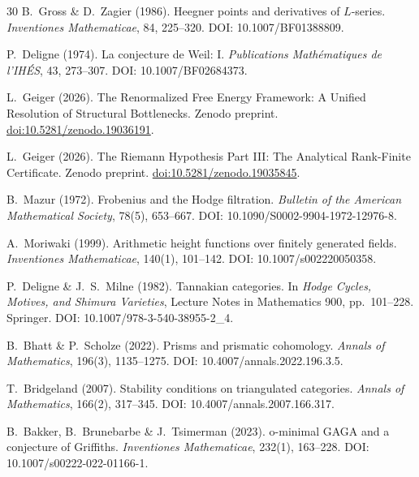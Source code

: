 \documentclass[aps,prd,twocolumn,superscriptaddress,nofootinbib]{revtex4-2}
\theoremstyle{definition}
\theoremstyle{remark}
\begin{document}
\begin{thebibliography}{30}
B.~Gross \& D.~Zagier (1986).
Heegner points and derivatives of $L$-series.
\textit{Inventiones Mathematicae}, 84, 225--320.
DOI: 10.1007/BF01388809.

P.~Deligne (1974).
La conjecture de Weil: I.
\textit{Publications Math\'ematiques de l'IH\'ES}, 43, 273--307.
DOI: 10.1007/BF02684373.

L.~Geiger (2026).
The Renormalized Free Energy Framework: A Unified Resolution of Structural Bottlenecks.
Zenodo preprint.
\href{https://doi.org/10.5281/zenodo.19036191}{doi:10.5281/zenodo.19036191}.

L.~Geiger (2026).
The Riemann Hypothesis Part III: The Analytical Rank-Finite Certificate.
Zenodo preprint.
\href{https://doi.org/10.5281/zenodo.19035845}{doi:10.5281/zenodo.19035845}.

B.~Mazur (1972).
Frobenius and the Hodge filtration.
\textit{Bulletin of the American Mathematical Society}, 78(5), 653--667.
DOI: 10.1090/S0002-9904-1972-12976-8.

A.~Moriwaki (1999).
Arithmetic height functions over finitely generated fields.
\textit{Inventiones Mathematicae}, 140(1), 101--142.
DOI: 10.1007/s002220050358.

P.~Deligne \& J.~S.~Milne (1982).
Tannakian categories.
In \textit{Hodge Cycles, Motives, and Shimura Varieties}, Lecture Notes in Mathematics 900, pp.\ 101--228. Springer.
DOI: 10.1007/978-3-540-38955-2\_4.

B.~Bhatt \& P.~Scholze (2022).
Prisms and prismatic cohomology.
\textit{Annals of Mathematics}, 196(3), 1135--1275.
DOI: 10.4007/annals.2022.196.3.5.

T.~Bridgeland (2007).
Stability conditions on triangulated categories.
\textit{Annals of Mathematics}, 166(2), 317--345.
DOI: 10.4007/annals.2007.166.317.

B.~Bakker, B.~Brunebarbe \& J.~Tsimerman (2023).
o-minimal GAGA and a conjecture of Griffiths.
\textit{Inventiones Mathematicae}, 232(1), 163--228.
DOI: 10.1007/s00222-022-01166-1.

\end{thebibliography}
\end{document}
